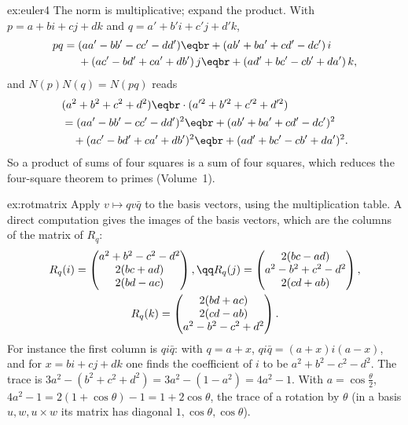 \begin{solution}{ex:euler4}
\idea The norm is multiplicative; expand the product.
\writeup With $p=a+bi+cj+dk$ and $q=a'+b'i+c'j+d'k$,
\[
\begin{aligned}
pq={}&(aa'-bb'-cc'-dd')\eqbr+(ab'+ba'+cd'-dc')\,i\\
&+(ac'-bd'+ca'+db')\,j\eqbr+(ad'+bc'-cb'+da')\,k,
\end{aligned}
\]
and $N(p)N(q)=N(pq)$ reads
\[
\begin{aligned}
&(a^2+b^2+c^2+d^2)\eqbr\cdot(a'^2+b'^2+c'^2+d'^2)\\
&=(aa'-bb'-cc'-dd')^2\eqbr+(ab'+ba'+cd'-dc')^2\\
&\quad+(ac'-bd'+ca'+db')^2\eqbr+(ad'+bc'-cb'+da')^2.
\end{aligned}
\]
So a product of sums of four squares is a sum of four squares, which reduces the four-square theorem to primes (Volume~1).
\end{solution}

\begin{solution}{ex:rotmatrix}
\idea Apply $v\mapsto qv\bar q$ to the basis vectors, using the multiplication table.
\writeup A direct computation  gives the images of the basis vectors, which are the columns of the matrix of $R_q$:
\[
\begin{gathered}
R_q(i)=\begin{pmatrix}a^2+b^2-c^2-d^2\\2(bc+ad)\\2(bd-ac)\end{pmatrix},\qq
R_q(j)=\begin{pmatrix}2(bc-ad)\\a^2-b^2+c^2-d^2\\2(cd+ab)\end{pmatrix},\\
R_q(k)=\begin{pmatrix}2(bd+ac)\\2(cd-ab)\\a^2-b^2-c^2+d^2\end{pmatrix}.
\end{gathered}
\]
For instance the first column is $qi\bar q$: with $q=a+x$, $qi\bar q=(a+x)i(a-x)$, and for $x=bi+cj+dk$ one finds the coefficient of $i$ to be $a^2+b^2-c^2-d^2$. The trace is $3a^2-(b^2+c^2+d^2)=3a^2-(1-a^2)=4a^2-1$. With $a=\cos\frac\theta2$, $4a^2-1=2(1+\cos\theta)-1=1+2\cos\theta$, the trace of a rotation by $\theta$ (in a basis $u,w,u\times w$ its matrix has diagonal $1,\cos\theta,\cos\theta$).
\end{solution}

